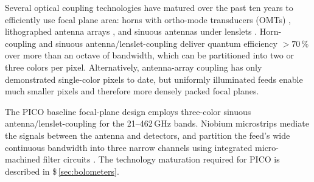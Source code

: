 Several optical coupling technologies have matured over the past ten
years to efficiently use focal plane area: horns with ortho-mode
transducers (OMTs) \citep{Duff2016}, lithographed antenna arrays
\citep{BICEP2015}, and sinuous antennas under lenslets
\citep{Edwards2012}. Horn-coupling and sinuous
antenna/lenslet-coupling deliver quantum efficiency $>70\,\%$ over
more than an octave of bandwidth, which can be partitioned into two
or three colors per pixel.  Alternatively, antenna-array coupling has
only demonstrated single-color pixels to date, but uniformly
illuminated feeds enable much smaller pixels and therefore more
densely packed focal planes.

%

The PICO baseline focal-plane design
employs three-color sinuous antenna/lenslet-coupling \citep{Suzuki2014}
for the 21--462\,GHz bands. Niobium microstrips mediate the signals
between the antenna and detectors, and partition the feed's wide
continuous bandwidth into three narrow channels using integrated
micro-machined filter circuits \citep{OBrient2013}. The technology
maturation required for PICO is described in \$\,\ref{sec:bolometers}.




